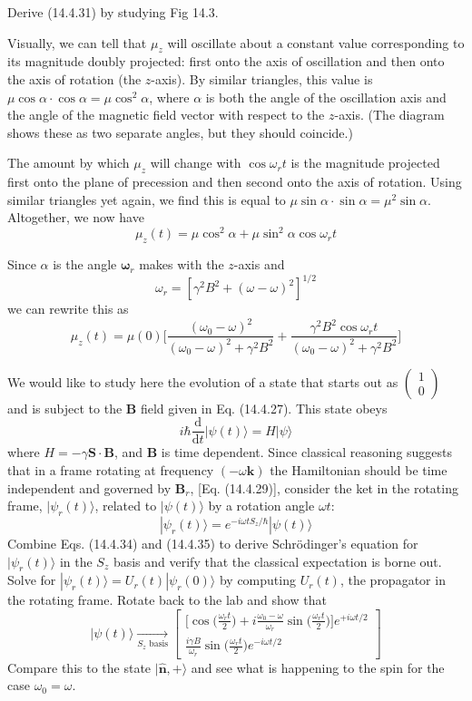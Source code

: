 \documentclass[../principles-of-quantum-mechanics.tex]{subfiles}
\begin{document}
\begin{questions}
		\question Derive (14.4.31) by studying Fig 14.3.
		\begin{solution}
			Visually, we can tell that $\mu_z$ will oscillate about a constant value corresponding to its magnitude doubly projected: first onto the axis of oscillation and then onto the axis of rotation (the $z$-axis). By similar triangles, this value is $\mu\cos\alpha\cdot\cos\alpha = \mu\cos^2\alpha$, where $\alpha$ is both the angle of the oscillation axis and the angle of the magnetic field vector with respect to the $z$-axis. (The diagram shows these as two separate angles, but they should coincide.)
			
			The amount by which $\mu_z$ will change with $\cos\omega_rt$ is the magnitude projected first onto the plane of precession and then second onto the axis of rotation. Using similar triangles yet again, we find this is equal to $\mu\sin\alpha\cdot\sin\alpha = \mu^2\sin\alpha$. Altogether, we now have
			$$\mu_z(t) = \mu\cos^2\alpha + \mu\sin^2\alpha\cos\omega_rt$$
			
			Since $\alpha$ is the angle $\boldsymbol{\omega}_r$ makes with the $z$-axis and
			$$\omega_r = [\gamma^2B^2 + (\omega - \omega)^2]^{1/2}$$
			we can rewrite this as
			$$\mu_z(t) = \mu(0)\Big[\frac{(\omega_0 - \omega)^2}{(\omega_0 - \omega)^2 + \gamma^2B^2} + \frac{\gamma^2B^2\cos\omega_rt}{(\omega_0 - \omega)^2 + \gamma^2B^2}\Big]$$
		\end{solution}
		
		\question We would like to study here the evolution of a state that starts out as $\begin{pmatrix}1 \\ 0 \end{pmatrix}$ and is subject to the $\mathbf{B}$ field given in Eq. (14.4.27). This state obeys
		$$i\hbar\frac{\mathrm{d}}{\mathrm{d}t}|\psi(t)\rangle = H|\psi\rangle$$
		where $H = -\gamma\mathbf{S}\cdot\mathbf{B}$, and $\mathbf{B}$ is time dependent. Since classical reasoning suggests that in a frame rotating at frequency $(-\omega\mathbf{k})$ the Hamiltonian should be time independent and governed by $\mathbf{B}_r$, [Eq. (14.4.29)], consider the ket in the rotating frame, $|\psi_r(t)\rangle$, related to $|\psi(t)\rangle$ by a rotation angle $\omega t$:
		$$|\psi_r(t)\rangle = e^{-i\omega tS_z/\hbar}|\psi(t)\rangle$$
		Combine Eqs. (14.4.34) and (14.4.35) to derive Schr\"odinger's equation for $|\psi_r(t)\rangle$ in the $S_z$ basis and verify that the classical expectation is borne out. Solve for $|\psi_r(t)\rangle = U_r(t)|\psi_r(0)\rangle$ by computing $U_r(t)$, the propagator in the rotating frame. Rotate back to the lab and show that
		$$|\psi(t)\rangle \xrightarrow[S_z\text{ basis}]{}\begin{bmatrix}\Big[\cos\Big(\frac{\omega_rt}{2}\Big) + i\frac{\omega_0 - \omega}{\omega_r}\sin\Big(\frac{\omega_rt}{2}\Big)\Big]e^{+i\omega t/2} \\ \frac{i\gamma B}{\omega_r}\sin\Big(\frac{\omega_rt}{2}\Big)e^{-i\omega t/2}\end{bmatrix}$$
		Compare this to the state $|\hat{\mathbf{n}}, +\rangle$ and see what is happening to the spin for the case $\omega_0 = \omega$.
		

\end{questions}
\end{document}

